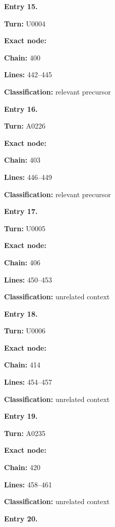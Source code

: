 \textbf{Entry 15.}

\textbf{Turn:} U0004

\textbf{Exact node:} \protect{}

\textbf{Chain:} 400

\textbf{Lines:} 442--445

\textbf{Classification:} relevant precursor


\textbf{Entry 16.}

\textbf{Turn:} A0226

\textbf{Exact node:} \protect{}

\textbf{Chain:} 403

\textbf{Lines:} 446--449

\textbf{Classification:} relevant precursor


\textbf{Entry 17.}

\textbf{Turn:} U0005

\textbf{Exact node:} \protect{}

\textbf{Chain:} 406

\textbf{Lines:} 450--453

\textbf{Classification:} unrelated context


\textbf{Entry 18.}

\textbf{Turn:} U0006

\textbf{Exact node:} \protect{}

\textbf{Chain:} 414

\textbf{Lines:} 454--457

\textbf{Classification:} unrelated context


\textbf{Entry 19.}

\textbf{Turn:} A0235

\textbf{Exact node:} \protect{}

\textbf{Chain:} 420

\textbf{Lines:} 458--461

\textbf{Classification:} unrelated context


\textbf{Entry 20.}

